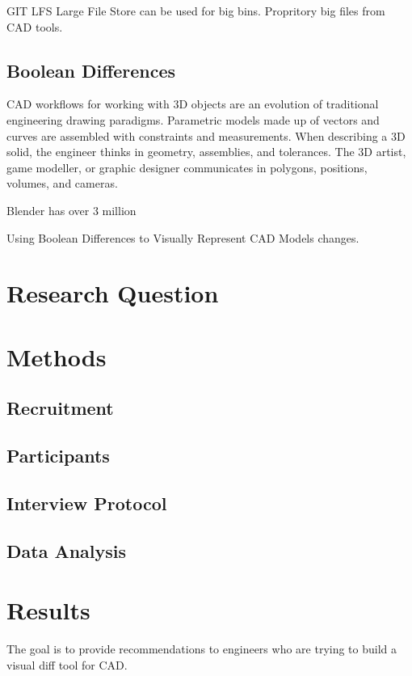 \documentclass[sigconf]{acmart}
\begin{document}
GIT LFS Large File Store can be used for big bins. Propritory big files from CAD tools.

\subsection{Boolean Differences}

CAD workflows for working with 3D objects are an evolution of traditional engineering drawing paradigms.
Parametric models made up of vectors and curves are assembled with constraints and measurements.
When describing a 3D solid, the engineer thinks in geometry, assemblies, and tolerances.
The 3D artist, game modeller, or graphic designer communicates in polygons, positions, volumes, and cameras.

Blender has over 3 million

Using Boolean Differences to Visually Represent CAD Models changes.

\section{Research Question}


\section{Methods}

\subsection{Recruitment}
\subsection{Participants}
\subsection{Interview Protocol}
\subsection{Data Analysis}

\section{Results}


The goal is to provide recommendations to engineers who are trying to build a visual diff tool for CAD.
\end{document}

